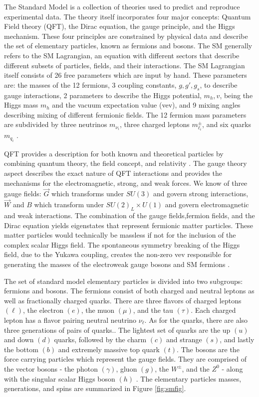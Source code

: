 The Standard Model is a collection of theories used to predict and reproduce experimental data. The theory itself incorporates four major concepts: Quantum Field theory (QFT), the Dirac equation, the gauge principle, and the Higgs mechanism. These four principles are constrained by physical data and describe the set of elementary particles, known as fermions and bosons. The SM generally refers to the SM Lagrangian, an equation with different sectors that describe different subsets of particles, fields, and their interactions. The SM Lagrangian itself consists of 26 free parameters which are input by hand. These parameters are: the masses of the 12 fermions, 3 coupling constants, $g, g', g_s$, to describe gauge interactions,  2 parameters to describe the Higgs potential, $m_h, v$, being the Higgs mass $m_h$ and the vacuum expectation value (vev), and 9 mixing angles describing mixing of different fermionic fields. The 12 fermion mass parameters are subdivided by three neutrinos $m_{\nu_i}$, three charged leptons $m_{\ell_i}^\pm$, and six quarks $m_{q_i}$ \cite{Thomson:2013zua}.

QFT provides a description for both known and theoretical particles by combining quantum theory, the field concept, and relativity \cite{Peskin:1995ev}. The gauge theory aspect describes the exact nature of QFT interactions and provides the mechanisms for the electromagnetic, strong, and weak forces.  We know of three gauge fields:  $\vec{G}$ which transforms under $SU(3)$ and govern strong interactions, $\vec{W}$ and $B$ which transform under $SU(2)_L \times U(1)$ and govern electromagnetic and weak interactions. The combination of the gauge fields,fermion fields, and the Dirac equation yields eigenstates that represent fermionic matter particles. These matter particles would technically be massless if not for the inclusion of the complex scalar Higgs field.  The spontaneous symmetry breaking of the Higgs field, due to the Yukawa coupling, creates the non-zero vev responsible for generating the masses of the electroweak gauge bosons and SM fermions \cite{Higgs:1966ev}\cite{Bernardi:2008zz}.

The set of standard model elementary particles is divided into two subgroups: fermions and bosons.  The fermions consist of both charged and neutral leptons as well as fractionally charged quarks. There are three flavors of charged leptons $(\ell)$, the electron $(e)$, the muon $(\mu)$, and the tau $(\tau)$. Each charged lepton has a flavor pairing neutral neutrino $\nu_\ell$.  As for the quarks, there are also three generations of pairs of quarks.. The lightest set of quarks are the up $(u)$ and down $(d)$ quarks, followed by the charm $(c)$ and strange $(s)$, and lastly the bottom $(b)$ and extremely massive top quark $(t)$.  The bosons are the force carrying particles which represent the gauge fields. They are comprised of the vector bosons - the photon $(\gamma)$, gluon $(g)$, the $W^\pm$, and the $Z^0$ - along with the singular scalar Higgs boson $(h)$ \cite{ParticleDataGroup:2020ssz}. The elementary particles masses, generations, and spins are summarized in Figure \ref{fig:smfig}.

